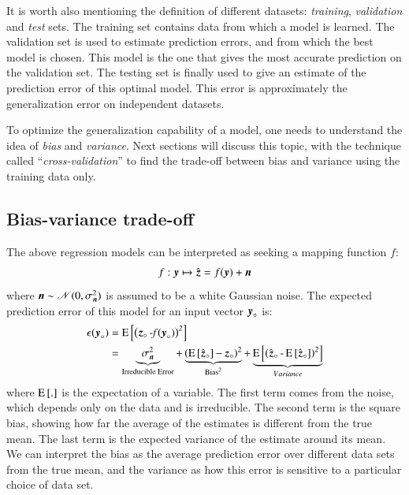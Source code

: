It is worth also mentioning the definition of different datasets: \textit{training}, \textit{validation} and \textit{test} sets. The training set contains data from which a model is learned. The validation set is used to estimate prediction errors, and from which the best model is chosen. This model is the one that gives the most accurate prediction on the validation set. The testing set is finally used to give an estimate of the prediction error of this optimal model. This error is approximately the generalization error on independent datasets.

To optimize the generalization capability of a model, one needs to understand the idea of \textit{bias} and \textit{variance}. Next sections will discuss this topic, with the technique called ``\textit{cross-validation}'' to find the trade-off between bias and variance using the training data only. 

\subsection{Bias-variance trade-off}
The above regression models can be interpreted as seeking a mapping function $ f $: 
\begin{equation}
	f:  \operatorname{\boldsymbol{y}}  \mapsto  \operatorname{\hat{\operatorname{\boldsymbol{z}} }} = f(\operatorname{\boldsymbol{y}} ) + \operatorname{\boldsymbol{n}}
\end{equation}
where $ \operatorname{\boldsymbol{n}} \sim \mathscr{N}(0,\sigma^2_{\operatorname{\boldsymbol{n}}})$ is assumed to be a white Gaussian noise. The expected prediction error of this model for an input vector $ \operatorname{\boldsymbol{y}}_{\circ} $ is:
\begin{equation}
\begin{split}
\epsilon(\operatorname{\boldsymbol{y}}_{\circ}) & =\operatorname{E \left[ \mathit{\left(\operatorname{\boldsymbol{z}}_{\circ} - f(\operatorname{\boldsymbol{y}}_{\circ})\right)^2} \right] } \\
  & = \underbrace{\sigma_{\operatorname{\boldsymbol{n}}}^2}_{\text{Irreducible Error}} + \underbrace{\left(\operatorname{E \left[ \mathit{\operatorname{\hat{\operatorname{\boldsymbol{z}} }}_{\circ}} \right] } - \operatorname{\boldsymbol{z}}_{\circ}\right)^2}_{\text{Bias}^2} + \underbrace{\operatorname{E \left[ \mathit{\left( \operatorname{\hat{\operatorname{\boldsymbol{z}} }}_{\circ} -  \operatorname{E \left[ \mathit{\operatorname{\hat{\operatorname{\boldsymbol{z}} }}_{\circ}} \right] } \right)^2} \right] }}_{Variance}
\end{split}
\end{equation}
where $ \operatorname{E \left[ \mathit{.} \right] } $ is the expectation of a variable. The first term comes from the noise, which depends only on the data and is irreducible. The second term is the square bias, showing how far the average of the estimates is different from the true mean. The last term is the expected variance of the estimate around its mean. We can interpret the bias as the average prediction error over different data sets from the true mean, and the variance as how this error is sensitive to a particular choice of data set.

